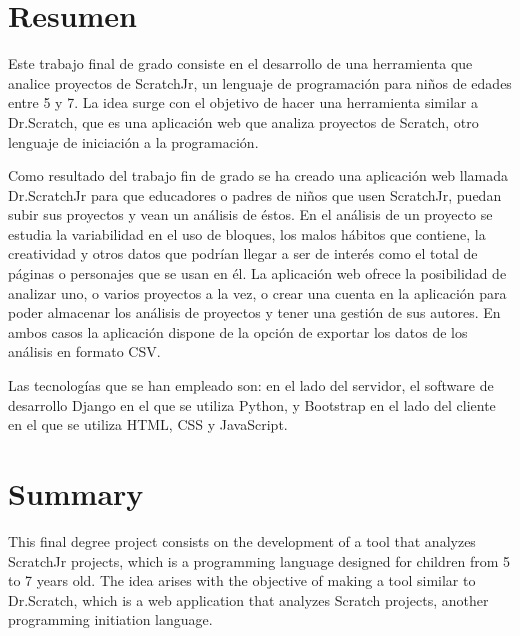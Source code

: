 \documentclass[a4paper, 12pt]{book}
\begin{document}

\chapter*{Resumen}

Este trabajo final de grado consiste en el desarrollo de una herramienta que analice proyectos de ScratchJr, un lenguaje de programación para niños de edades entre 5 y 7.  
La idea surge con el objetivo de hacer una herramienta similar a Dr.Scratch, que es una aplicación web que analiza proyectos de Scratch, otro lenguaje de iniciación a la programación. 

\vspace{5mm}

Como resultado del trabajo fin de grado se ha creado una aplicación web llamada Dr.ScratchJr para que educadores o padres de niños que usen ScratchJr, puedan subir sus proyectos y vean un análisis de éstos.
En el análisis de un proyecto se estudia la variabilidad en el uso de bloques, los malos hábitos que contiene, la creatividad y otros datos que podrían llegar a ser de interés como el total de páginas o personajes que se usan en él. 
La aplicación web ofrece la posibilidad de analizar uno, o varios proyectos a la vez, o crear una cuenta en la aplicación para poder almacenar los análisis de proyectos y tener una gestión de sus autores. 
En ambos casos la aplicación dispone de la opción de exportar los datos de los análisis en formato CSV.

\vspace{5mm}

Las tecnologías que se han empleado son: en el lado del servidor, el software de desarrollo Django en el que se utiliza Python, y Bootstrap en el lado del cliente en el que se utiliza HTML, CSS y JavaScript.


\chapter*{Summary}

This final degree project consists on the development of a tool that analyzes ScratchJr projects, which is a programming language designed for children from 5 to 7 years old.
The idea arises with the objective of making a tool similar to Dr.Scratch, which is a web application that analyzes Scratch projects, another programming initiation language.
\end{document}
